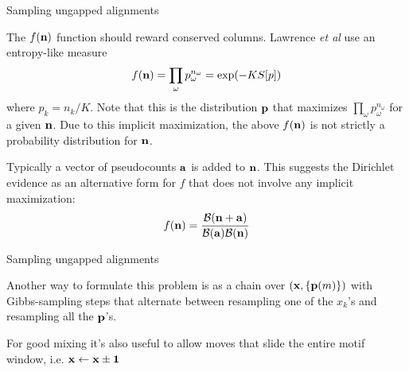 \documentclass{beamer}
\begin{document}
\begin{frame}{Sampling ungapped alignments}

\itemb
\item The $f({\bf n})$ function should reward conserved columns.
Lawrence {\em et al} use an entropy-like measure
\[
f({\bf n}) = \prod_\omega p_\omega^{n_\omega} = \exp (-KS[p])
\]
where $p_k = n_k/K$.
Note that this is the distribution ${\bf p}$ that maximizes $\prod_\omega p_\omega^{n_\omega}$ for a given ${\bf n}$.
Due to this implicit maximization, the above $f({\bf n})$ is not strictly a probability distribution for ${\bf n}$.
 \item Typically a vector of pseudocounts ${\bf a}$ is added to ${\bf n}$.
This suggests the Dirichlet evidence as an alternative form for $f$ that does not involve any implicit maximization:
\[
f({\bf n}) = \frac{{\cal B}({\bf n} + {\bf a})}{{\cal B}({\bf a}){\cal B}({\bf n})}
\]
\iteme

\end{frame}


\begin{frame}{Sampling ungapped alignments}

\itemb
 \item Another way to formulate this problem is as a chain over $({\bf x},\{{\bf p}(m)\})$ with Gibbs-sampling steps that alternate between resampling one of the $x_k$'s and resampling all the ${\bf p}$'s.
 \item For good mixing it's also useful to allow moves that slide the entire motif window, i.e. ${\bf x} \leftarrow {\bf x} \pm {\bf 1}$
\iteme

\end{frame}


% 
% 
\end{document}
